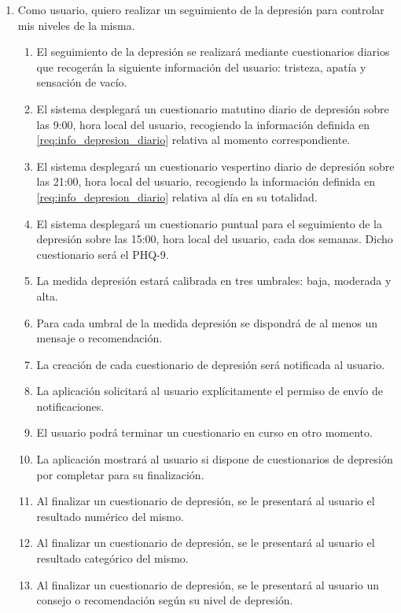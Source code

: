         \begin{enumerate}[resume=req-usuario,label=\textbf{\texttt{RU-\arabic*}}]
            \item Como usuario, quiero realizar un seguimiento de la depresión para controlar mis niveles de la misma.
            \begin{enumerate}[resume=req-funcionales,label=\textbf{\texttt{RF-\arabic*}}]
                \item \label{req:info_depresion_diario} El seguimiento de la depresión se realizará mediante cuestionarios diarios que recogerán la siguiente información del usuario: tristeza, apatía y sensación de vacío.
                \item El sistema desplegará un cuestionario matutino diario de depresión sobre las 9:00, hora local del usuario, recogiendo la información definida en \ref{req:info_depresion_diario} relativa al momento correspondiente.
                \item  El sistema desplegará un cuestionario vespertino diario de depresión sobre las 21:00, hora local del usuario, recogiendo la información definida en \ref{req:info_depresion_diario} relativa al día en su totalidad.
                \item El sistema desplegará un cuestionario puntual para el seguimiento de la depresión sobre las 15:00, hora local del usuario, cada dos semanas. Dicho cuestionario será el PHQ-9.
                \item La medida depresión estará calibrada en tres umbrales: baja, moderada y alta.
                \item Para cada umbral de la medida depresión se dispondrá de al menos un mensaje o recomendación.
                \item La creación de cada cuestionario de depresión será notificada al usuario.
                \item La aplicación solicitará al usuario explícitamente el permiso de envío de notificaciones.
                \item El usuario podrá terminar un cuestionario en curso en otro momento.
                \item La aplicación mostrará al usuario si dispone de cuestionarios de depresión por completar para su finalización.
                \item Al finalizar un cuestionario de depresión, se le presentará al usuario el resultado numérico del mismo.
                \item Al finalizar un cuestionario de depresión, se le presentará al usuario el resultado categórico del mismo.
                \item Al finalizar un cuestionario de depresión, se le presentará al usuario un consejo o recomendación según su nivel de depresión.
            \end{enumerate}
        \end{enumerate}
